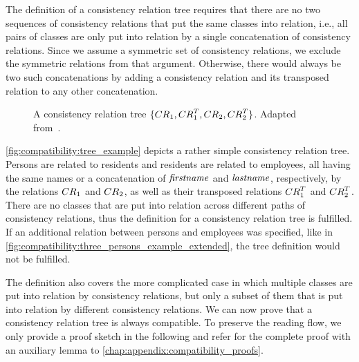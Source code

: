 The definition of a consistency relation tree requires that there are no two sequences of consistency relations that put the same classes into relation, i.e., all pairs of classes are only put into relation by a single concatenation of consistency relations.
Since we assume a symmetric set of consistency relations, we exclude the symmetric relations from that argument.
Otherwise, there would always be two such concatenations by adding a consistency relation and its transposed relation to any other concatenation.

\begin{figure}
    \centering
    
    \caption[A consistency relation tree]{A consistency relation tree $\setted{\consistencyrelation{CR}{1}, \consistencyrelation{CR}{1}^T, \consistencyrelation{CR}{2}, \consistencyrelation{CR}{2}^T}$. Adapted from~.}
    \label{fig:compatibility:tree_example}
\end{figure}

\begin{example}
\autoref{fig:compatibility:tree_example} depicts a rather simple consistency relation tree. 
Persons are related to residents and residents are related to employees, all having the same names or a concatenation of $\mathit{firstname}$ and $\mathit{lastname}$, respectively, by the relations $\consistencyrelation{CR}{1}$ and $\consistencyrelation{CR}{2}$, as well as their transposed relations $\consistencyrelation{CR}{1}^T$ and $\consistencyrelation{CR}{2}^T$.
There are no classes that are put into relation across different paths of consistency relations, thus the definition for a consistency relation tree is fulfilled. 
If an additional relation between persons and employees was specified, like in \autoref{fig:compatibility:three_persons_example_extended}, the tree definition would not be fulfilled.
\end{example}

The definition also covers the more complicated case in which multiple classes are put into relation by consistency relations, but only a subset of them that is put into relation by different consistency relations.
%
%
We can now prove that a consistency relation tree is always compatible.
To preserve the reading flow, we only provide a proof sketch in the following and refer for the complete proof with an auxiliary lemma to \autoref{chap:appendix:compatibility_proofs}.

